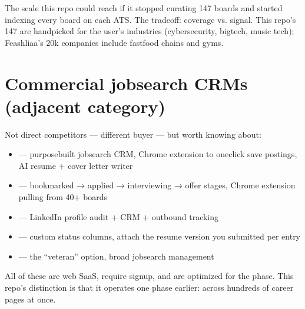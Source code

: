 \documentclass[a4paper,11pt,english]{sphinxmanual}
\begin{document}
\sphinxAtStartPar
{} The scale this repo could reach if it stopped curating 147
boards and started indexing every board on each ATS. The tradeoff:
coverage vs. signal. This repo’s 147 are hand\sphinxhyphen{}picked for the user’s
industries (cybersecurity, big\sphinxhyphen{}tech, music tech); Feashliaa’s 20k
companies include fast\sphinxhyphen{}food chains and gyms.


\section{Commercial job\sphinxhyphen{}search CRMs (adjacent category)}
\label{\detokenize{analysis:commercial-job-search-crms-adjacent-category}}
\sphinxAtStartPar
Not direct competitors — different buyer — but worth knowing about:
\begin{itemize}
\item {} 
\sphinxAtStartPar
{} — purpose\sphinxhyphen{}built job\sphinxhyphen{}search CRM, Chrome extension to one\sphinxhyphen{}click
save postings, AI resume + cover letter writer

\item {} 
\sphinxAtStartPar
{} — bookmarked → applied → interviewing → offer stages,
Chrome extension pulling from 40+ boards

\item {} 
\sphinxAtStartPar
{} — LinkedIn profile audit + CRM + outbound tracking

\item {} 
\sphinxAtStartPar
{} — custom status columns, attach the resume version
you submitted per entry

\item {} 
\sphinxAtStartPar
{} — the “veteran” option, broad job\sphinxhyphen{}search management

\end{itemize}

\sphinxAtStartPar
All of these are web SaaS, require signup, and are optimized for the
 phase. This repo’s distinction is that it
operates one phase earlier: 
across hundreds of career pages at once.
\end{document}
